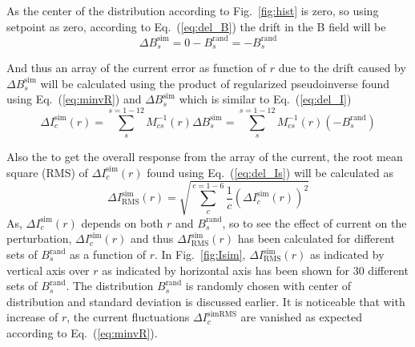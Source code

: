\FloatBarrier
As the center of the distribution according to Fig.~\ref{fig:hist} is zero, so using setpoint as zero, according to Eq.~(\ref{eq:del_B}) the drift in the B field will be  
\begin{equation}\label{eq:del_Bs}
    \Delta B_s^{\text{sim}} = 0 - B_s^{\text{rand}}=-B_s^{\text{rand}}
\end{equation}

And thus an array of the current error  as function of $r$ due to the drift caused by $\Delta B_s^{\text{sim}}$ will be calculated using the product of regularized pseudoinverse found using Eq.~(\ref{eq:minvR}) and $\Delta B_s^{\text{sim}}$ which is similar to Eq.~(\ref{eq:del_I})
\begin{equation}\label{eq:del_Is}
    \Delta I_c^{\text{sim}}(r) =\sum_s^{s=1-12} M^{-1}_{cs}(r) \Delta B_s^{\text{sim}}=\sum_s^{s=1-12} M^{-1}_{cs}(r) (-B_s^{\text{rand}})
\end{equation}

Also the to get the overall response from the array of the current, the root mean square (RMS) of $\Delta I_c^{\text{sim}}(r)$ found using Eq.~(\ref{eq:del_Is}) will be calculated as
\begin{equation}
     \Delta I_{\text{RMS}}^{\text{sim}}(r)= \sqrt{\sum_c^{c=1-6} \frac{1}{c}(\Delta I_c^{\text{sim}}(r))^2}
\end{equation}
As, $\Delta I_c^{\text{sim}}(r)$ depends on both $r$ and $B_s^{\text{rand}}$, so to see the effect of current on the perturbation, $\Delta I_c^{\text{sim}}(r)$ and thus $ \Delta I_{\text{RMS}}^{\text{sim}}(r)$  has been calculated for different sets of $B_s^{\text{rand}}$ as a function of $r$. In Fig.~\ref{fig:Isim}, $ \Delta I_{\text{RMS}}^{\text{sim}}(r)$ as indicated by vertical axis over $r$ as indicated by horizontal axis has been shown for 30 different sets of $B_s^{\text{rand}}$. The distribution $B_s^{\text{rand}}$ is randomly chosen with center of distribution and standard deviation is discussed earlier. It is noticeable that with increase of $r$, the current fluctuations $\Delta I_c^{\text{simRMS}}$ are vanished as expected according to Eq.~(\ref{eq:minvR}).


